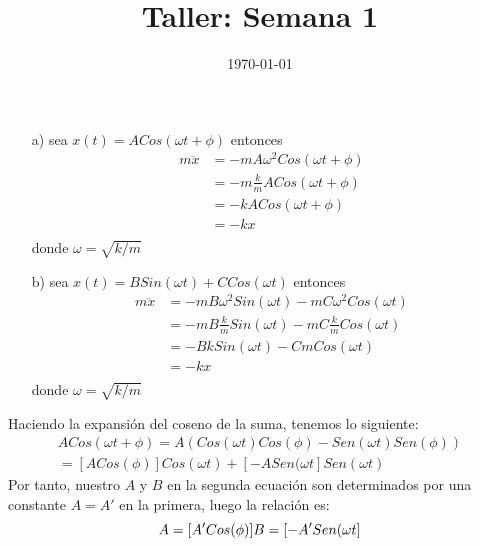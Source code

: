 \documentclass[a4paper]{article}
\date{\today}
\title{Taller: Semana 1}
\begin{document}
\header{}

\begin{answer}[Problema 1.]
    \begin{enumerate}
        \item [a)] sea $x(t) = ACos(\omega t + \phi)$ entonces
              \begin{equation*}
                  \begin{split}
                      m \ddot{x} &= -mA\omega^2 Cos(\omega t + \phi)\\
                      &=  -m\frac{k}{m}A Cos(\omega t + \phi)\\
                      &=  -k A Cos(\omega t + \phi)\\
                      &=  -kx\\
                  \end{split}
              \end{equation*}
              donde $\omega = \sqrt{k/m}$
        \item [b)] sea $x(t) = BSin(\omega t) + CCos(\omega t)$ entonces
              \begin{equation*}
                  \begin{split}
                      m \ddot{x} &= -mB\omega^2Sin(\omega t) - mC\omega^2Cos(\omega t)\\
                      &= -mB\frac{k}{m}Sin(\omega t) - mC\frac{k}{m}Cos(\omega t)\\
                      &= -BkSin(\omega t) - CmCos(\omega t)\\
                      &=  -kx\\
                  \end{split}
              \end{equation*}
              donde $\omega = \sqrt{k/m}$


    \end{enumerate}
\end{answer}

\begin{answer}[Problema 2.]
    Haciendo la expansión del coseno de la suma, tenemos lo siguiente:
    \begin{equation}
        \begin{split}
            A Cos(\omega t + \phi) = A(Cos(\omega t)Cos(\phi) - Sen(\omega t)Sen(\phi))\\
            = [ACos(\phi)]Cos(\omega t) + [-ASen(\omega t]Sen(\omega t)
        \end{split}
    \end{equation}
    Por tanto, nuestro $A$ y $B$ en la segunda ecuación son determinados por una constante $A=A'$ en la primera, luego la relación es:
    \begin{equation}
        A = [A'Cos(\phi)]\\
        B = [-A'Sen(\omega t]
    \end{equation}

\end{answer}
\end{document}
